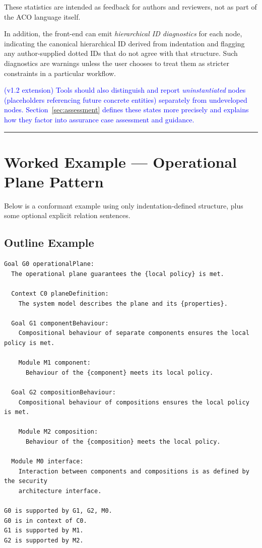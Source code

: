\documentclass[11pt]{article}
\begin{document}
These statistics are intended as feedback for authors and reviewers, not as part of the ACO language itself.

In addition, the front-end can emit \emph{hierarchical ID diagnostics} for each node, indicating the canonical hierarchical ID derived from indentation and flagging any author-supplied dotted IDs that do not agree with that structure. Such diagnostics are warnings unless the user chooses to treat them as stricter constraints in a particular workflow.

\textcolor{blue}{(v1.2 extension) Tools should also distinguish and report \emph{uninstantiated} nodes (placeholders referencing future concrete entities) separately from undeveloped nodes. Section~\ref{sec:assessment} defines these states more precisely and explains how they factor into assurance case assessment and guidance.}

\bigskip
\hrule
\bigskip

\section{Worked Example --- Operational Plane Pattern}

Below is a conformant example using only indentation-defined structure, plus some optional explicit relation sentences.

\subsection{Outline Example}\label{sec:aco_example}

\begin{verbatim}
Goal G0 operationalPlane:
  The operational plane guarantees the {local policy} is met.

  Context C0 planeDefinition:
    The system model describes the plane and its {properties}.

  Goal G1 componentBehaviour:
    Compositional behaviour of separate components ensures the local policy is met.

    Module M1 component:
      Behaviour of the {component} meets its local policy.

  Goal G2 compositionBehaviour:
    Compositional behaviour of compositions ensures the local policy is met.

    Module M2 composition:
      Behaviour of the {composition} meets the local policy.

  Module M0 interface:
    Interaction between components and compositions is as defined by the security
    architecture interface.

G0 is supported by G1, G2, M0.
G0 is in context of C0.
G1 is supported by M1.
G2 is supported by M2.
\end{verbatim}
\end{document}
